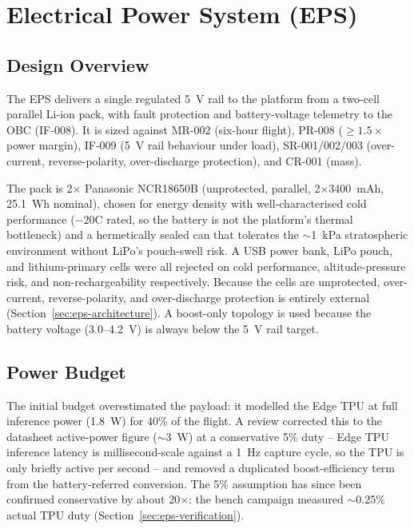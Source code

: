 \chapter{Electrical Power System (EPS)}

\section{Design Overview}

The EPS delivers a single regulated 5~V rail to the platform from a
two-cell parallel Li-ion pack, with fault protection and battery-voltage
telemetry to the OBC (IF-008). It is sized against MR-002 (six-hour flight),
PR-008 ($\geq 1.5\times$ power margin), IF-009 (5~V rail behaviour under
load), SR-001/002/003 (over-current, reverse-polarity, over-discharge
protection), and CR-001 (mass).

The pack is 2$\times$ Panasonic NCR18650B (unprotected, parallel,
2$\times$3400~mAh, 25.1~Wh nominal), chosen for energy density with
well-characterised cold performance ($-20$\textdegree{}C rated, so the
battery is not the platform's thermal bottleneck) and a hermetically sealed
can that tolerates the $\sim$1~kPa stratospheric environment without LiPo's
pouch-swell risk. A USB power bank, LiPo pouch, and lithium-primary cells
were all rejected on cold performance, altitude-pressure risk, and
non-rechargeability respectively. Because the cells are unprotected,
over-current, reverse-polarity, and over-discharge protection is entirely
external (Section~\ref{sec:eps-architecture}). A boost-only topology is
used because the battery voltage (3.0--4.2~V) is always below the 5~V
rail target.

\section{Power Budget}

The initial budget overestimated the payload: it modelled the Edge TPU at
full inference power (1.8~W) for 40\% of the flight. A review corrected
this to the datasheet active-power figure ($\sim$3~W) at a conservative
5\% duty -- Edge TPU inference latency is millisecond-scale against a
1~Hz capture cycle, so the TPU is only briefly active per second -- and
removed a duplicated boost-efficiency term from the battery-referred
conversion. The 5\% assumption has since been confirmed conservative by
about 20$\times$: the bench campaign measured $\sim$0.25\% actual TPU
duty (Section~\ref{sec:eps-verification}).

